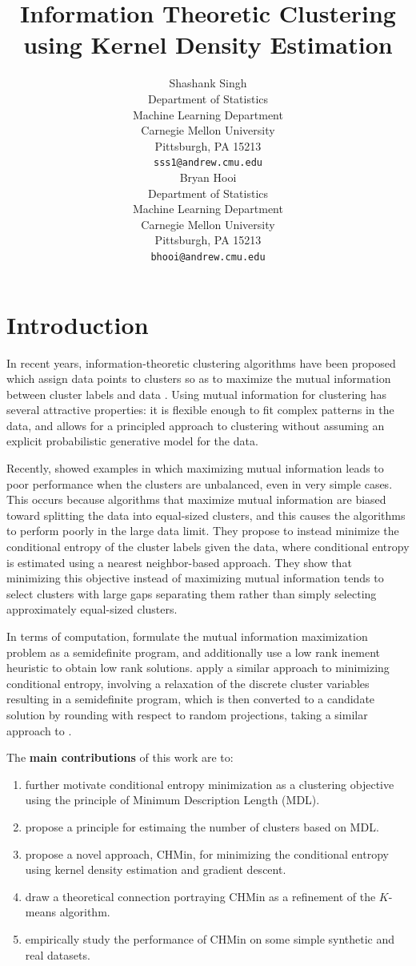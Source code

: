 \documentclass{article} %
\title{Information Theoretic Clustering using Kernel Density Estimation}
\author{
Shashank Singh \\
Department of Statistics\\
Machine Learning Department\\
Carnegie Mellon University\\
Pittsburgh, PA 15213 \\
\texttt{sss1@andrew.cmu.edu} \\
\And
Bryan Hooi \\
Department of Statistics\\
Machine Learning Department \\
Carnegie Mellon University \\
Pittsburgh, PA 15213 \\
\texttt{bhooi@andrew.cmu.edu} \\
}
\begin{document}
\maketitle
\section{Introduction}
In recent years, information-theoretic clustering algorithms have been proposed
which assign data points to clusters so as to maximize the mutual information
between cluster labels and data
\cite{faivishevsky2010nonparametric,wang2011information}. Using mutual
information for clustering has several attractive properties: it is flexible
enough to fit complex patterns in the data, and allows for a principled
approach to clustering without assuming an explicit probabilistic generative
model for the data. 

Recently, \cite{steeg2013demystifying} showed examples in which maximizing
mutual information leads to poor performance when the clusters are unbalanced,
even in very simple cases. This occurs because algorithms that maximize mutual
information are biased toward splitting the data into equal-sized clusters, and
this causes the algorithms to perform poorly in the large data limit. They
propose to instead minimize the conditional entropy of the cluster labels given
the data, where conditional entropy is estimated using a nearest neighbor-based
approach. They show that minimizing this objective instead of maximizing mutual
information tends to select clusters with large gaps separating them rather
than simply selecting approximately equal-sized clusters.

In terms of computation, \cite{wang2011information} formulate the mutual
information maximization problem as a semidefinite program, and additionally
use a low rank inement heuristic to obtain low rank solutions.
\cite{steeg2013demystifying} apply a similar approach to minimizing conditional
entropy, involving a relaxation of the discrete cluster variables resulting in
a semidefinite program, which is then converted to a candidate solution by
rounding with respect to random projections, taking a similar approach to
\cite{goemans1995improved}.

The {\bf main contributions} of this work are to:
\begin{enumerate}
\item further motivate conditional entropy minimization as a clustering
objective using the principle of Minimum Description Length (MDL).
\item propose a principle for estimaing the number of clusters based on MDL.
\item propose a novel approach, CHMin, for minimizing the conditional entropy
using kernel density estimation and gradient descent.
\item draw a theoretical connection portraying CHMin as a refinement of the
$K$-means algorithm.
\item empirically study the performance of CHMin on some simple synthetic and
real datasets.
\end{enumerate}
\end{document}
